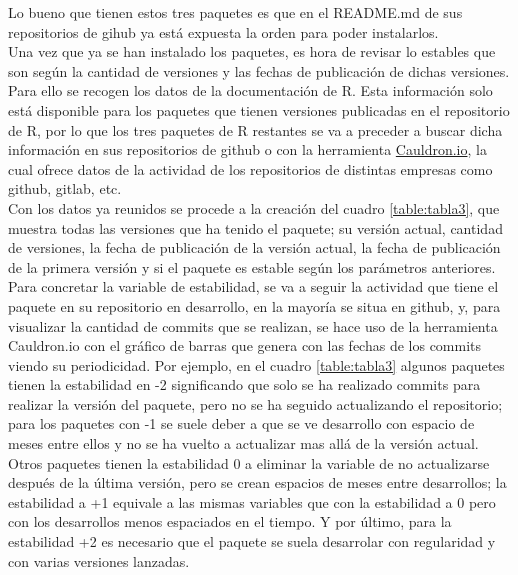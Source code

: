 \documentclass{article}\usepackage[]{graphicx}\usepackage[]{color}
\begin{document}
Lo bueno que tienen estos tres paquetes es que en el README.md de sus repositorios de gihub ya est\'a expuesta la orden para poder instalarlos.~\\
Una vez que ya se han instalado los paquetes, es hora de revisar lo estables que son seg\'un la cantidad de versiones y las fechas de publicaci\'on de dichas versiones. Para ello se recogen los datos de la documentaci\'on de R\cite{docu_r}. Esta informaci\'on solo est\'a disponible para los paquetes que tienen versiones publicadas en el repositorio de R, por lo que los tres paquetes de R restantes se va a preceder a buscar dicha informaci\'on en sus repositorios de github o con la herramienta \href{https://cauldron.io/}{Cauldron.io}\cite{cauldron}, la cual ofrece datos de la actividad de los repositorios de distintas empresas como github, gitlab, etc.~\\
Con los datos ya reunidos se procede a la creaci\'on del cuadro \ref{table:tabla3}, que muestra todas las versiones que ha tenido el paquete; su versi\'on actual, cantidad de versiones, la fecha de publicaci\'on de la versi\'on actual, la fecha de publicaci\'on de la primera versi\'on y si el paquete es estable seg\'un los par\'ametros anteriores.~\\
Para concretar la variable de estabilidad, se va a seguir la actividad que tiene el paquete en su repositorio en desarrollo, en la mayor\'ia se situa en github, y, para visualizar la cantidad de commits que se realizan, se hace uso de la herramienta Cauldron.io con el gr\'afico de barras que genera con las fechas de los commits viendo su periodicidad. Por ejemplo, en el cuadro \ref{table:tabla3} algunos paquetes tienen la estabilidad en -2 significando que solo se ha realizado commits para realizar la versi\'on del paquete, pero no se ha seguido actualizando el repositorio; para los paquetes con -1 se suele deber a que se ve desarrollo con espacio de meses entre ellos y no se ha vuelto a actualizar mas all\'a de la versi\'on actual. Otros paquetes tienen la estabilidad 0 a eliminar la variable de no actualizarse despu\'es de la \'ultima versi\'on, pero se crean espacios de meses entre desarrollos; la estabilidad a +1 equivale a las mismas variables que con la estabilidad a 0 pero con los desarrollos menos espaciados en el tiempo. Y por \'ultimo, para la estabilidad +2 es necesario que el paquete se suela desarrolar con regularidad y con varias versiones lanzadas.
\end{document}
